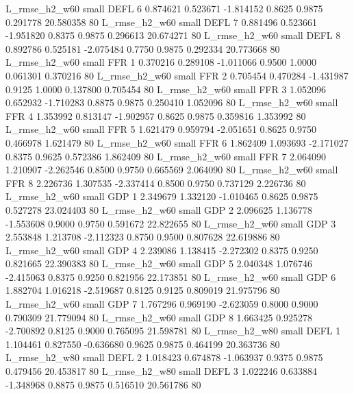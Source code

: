  L_rmse_h2_w60      small     DEFL                 6 0.874621 0.523671 -1.814152 0.8625 0.9875  0.291778   20.580358 80
 L_rmse_h2_w60      small     DEFL                 7 0.881496 0.523661 -1.951820 0.8375 0.9875  0.296613   20.674271 80
 L_rmse_h2_w60      small     DEFL                 8 0.892786 0.525181 -2.075484 0.7750 0.9875  0.292334   20.773668 80
 L_rmse_h2_w60      small      FFR                 1 0.370216 0.289108 -1.011066 0.9500 1.0000  0.061301    0.370216 80
 L_rmse_h2_w60      small      FFR                 2 0.705454 0.470284 -1.431987 0.9125 1.0000  0.137800    0.705454 80
 L_rmse_h2_w60      small      FFR                 3 1.052096 0.652932 -1.710283 0.8875 0.9875  0.250410    1.052096 80
 L_rmse_h2_w60      small      FFR                 4 1.353992 0.813147 -1.902957 0.8625 0.9875  0.359816    1.353992 80
 L_rmse_h2_w60      small      FFR                 5 1.621479 0.959794 -2.051651 0.8625 0.9750  0.466978    1.621479 80
 L_rmse_h2_w60      small      FFR                 6 1.862409 1.093693 -2.171027 0.8375 0.9625  0.572386    1.862409 80
 L_rmse_h2_w60      small      FFR                 7 2.064090 1.210907 -2.262546 0.8500 0.9750  0.665569    2.064090 80
 L_rmse_h2_w60      small      FFR                 8 2.226736 1.307535 -2.337414 0.8500 0.9750  0.737129    2.226736 80
 L_rmse_h2_w60      small      GDP                 1 2.349679 1.332120 -1.010465 0.8625 0.9875  0.527278   23.024403 80
 L_rmse_h2_w60      small      GDP                 2 2.096625 1.136778 -1.553608 0.9000 0.9750  0.591672   22.822655 80
 L_rmse_h2_w60      small      GDP                 3 2.553848 1.213708 -2.112323 0.8750 0.9500  0.807628   22.619886 80
 L_rmse_h2_w60      small      GDP                 4 2.239086 1.138415 -2.272302 0.8375 0.9250  0.821665   22.390383 80
 L_rmse_h2_w60      small      GDP                 5 2.040348 1.076746 -2.415063 0.8375 0.9250  0.821956   22.173851 80
 L_rmse_h2_w60      small      GDP                 6 1.882704 1.016218 -2.519687 0.8125 0.9125  0.809019   21.975796 80
 L_rmse_h2_w60      small      GDP                 7 1.767296 0.969190 -2.623059 0.8000 0.9000  0.790309   21.779094 80
 L_rmse_h2_w60      small      GDP                 8 1.663425 0.925278 -2.700892 0.8125 0.9000  0.765095   21.598781 80
 L_rmse_h2_w80      small     DEFL                 1 1.104461 0.827550 -0.636680 0.9625 0.9875  0.464199   20.363736 80
 L_rmse_h2_w80      small     DEFL                 2 1.018423 0.674878 -1.063937 0.9375 0.9875  0.479456   20.453817 80
 L_rmse_h2_w80      small     DEFL                 3 1.022246 0.633884 -1.348968 0.8875 0.9875  0.516510   20.561786 80
